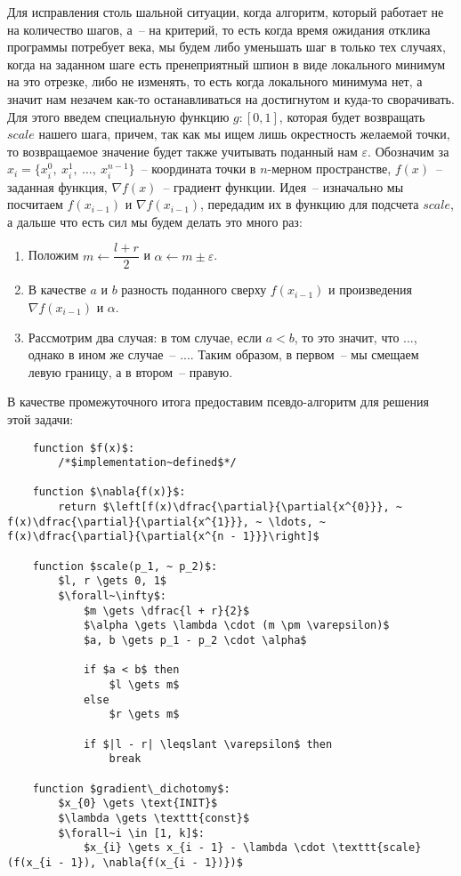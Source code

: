 \documentclass[12pt, a4paper, oneside]{article}
\begin{document}
	Для исправления столь шальной ситуации, когда алгоритм, который работает не на количество шагов, а~-- на критерий, то есть когда время ожидания отклика программы потребует века, мы будем либо уменьшать шаг в только тех случаях, когда на заданном шаге есть пренеприятный шпион в виде локального минимум на это отрезке, либо не изменять, то есть когда локального минимума нет, а значит нам незачем как-то останавливаться на достигнутом и куда-то сворачивать. Для этого введем специальную функцию $g : [0, 1]$, которая будет возвращать $scale$ нашего шага, причем, так как мы ищем лишь окрестность желаемой точки, то возвращаемое значение будет также учитывать поданный нам $\varepsilon$. Обозначим за $x_{i} = \{x^0_{i}, ~ x^1_{i}, ~ \ldots, ~ x^{n - 1}_i\}$~-- координата точки в $n$-мерном пространстве, $f(x)$~-- заданная функция, $\nabla{f(x)}$~-- градиент функции. Идея~-- изначально мы посчитаем $f(x_{i - 1})$ и $\nabla{f(x_{i - 1})}$, передадим их в функцию для подсчета $scale$, а дальше что есть сил мы будем делать это много раз:
	\begin{enumerate}[(1)]
		\item Положим $m \gets \dfrac{l + r}{2}$ и $\alpha \gets m \pm \varepsilon$.
		\item В качестве $a$ и $b$ разность поданного сверху $f(x_{i - 1})$ и произведения $\nabla{f(x_{i - 1})}$ и $\alpha$.
		\item Рассмотрим два случая: в том случае, если $a < b$, то это значит, что ..., однако в ином же случае~-- .... Таким образом, в первом~-- мы смещаем левую границу, а в втором~-- правую.
	\end{enumerate}
	В качестве промежуточного итога предоставим псевдо-алгоритм для решения этой задачи:
	\begin{lstlisting}
	function $f(x)$:
		/*$implementation~defined$*/
	
	function $\nabla{f(x)}$:
		return $\left[f(x)\dfrac{\partial}{\partial{x^{0}}}, ~ f(x)\dfrac{\partial}{\partial{x^{1}}}, ~ \ldots, ~ f(x)\dfrac{\partial}{\partial{x^{n - 1}}}\right]$

	function $scale(p_1, ~ p_2)$:
		$l, r \gets 0, 1$
		$\forall~\infty$:
			$m \gets \dfrac{l + r}{2}$
			$\alpha \gets \lambda \cdot (m \pm \varepsilon)$
			$a, b \gets p_1 - p_2 \cdot \alpha$

			if $a < b$ then
				$l \gets m$
			else
				$r \gets m$

			if $|l - r| \leqslant \varepsilon$ then
				break

	function $gradient\_dichotomy$:
		$x_{0} \gets \text{INIT}$
		$\lambda \gets \texttt{const}$
		$\forall~i \in [1, k]$:
			$x_{i} \gets x_{i - 1} - \lambda \cdot \texttt{scale}(f(x_{i - 1}), \nabla{f(x_{i - 1})})$
	\end{lstlisting}
\end{document}
